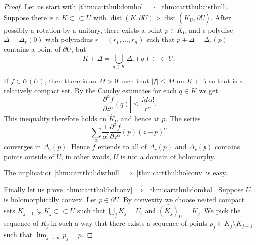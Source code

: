 \documentclass[12pt,openany]{book}
\newcommand{\sabs}[1]{\lvert {#1} \rvert}
\newcommand{\abs}[1]{\left\lvert {#1} \right\rvert}
\newcommand{\sO}{{\mathcal{O}}}
\theoremstyle{plain}
\theoremstyle{remark}
\theoremstyle{definition}
\theoremstyle{exercise}
\theoremstyle{example}
\begin{document}
\begin{proof}
Let us start with \eqref{thm:cartthul:domhol} $\Rightarrow$
\eqref{thm:cartthul:disthull}.  Suppose there is a $K \subset
\subset U$ with $\operatorname{dist}(K,\partial U) > \operatorname{dist}(\widehat{K}_U,\partial U)$.
After possibly a rotation by a unitary,
there exists a point $p \in \widehat{K}_U$ and a polydisc
$\Delta = \Delta_r(0)$ with polyradius $r = (r_1,\ldots,r_n)$ such that
$p + \Delta = \Delta_r(p)$ contains a point of $\partial U$, but
\begin{equation*}
K + \Delta = \bigcup_{q \in K} \Delta_r(q) \subset \subset U.
\end{equation*}

\begin{center}

\end{center}

If $f \in \sO(U)$, then there is an $M > 0$ such that $\sabs{f} \leq M$ on
$K + \Delta$ as that is a relatively compact set.  By the Cauchy estimates
for each $q \in K$ we get
\begin{equation*}
\abs{\frac{\partial^\alpha f}{\partial z^\alpha}(q)} \leq \frac{M
\alpha!}{r^\alpha} .
\end{equation*}
This inequality therefore holds on $\widehat{K}_U$ and hence at $p$.
The series
\begin{equation*}
\sum_{\alpha}
\frac{1}{\alpha !}\frac{\partial^\alpha f}{\partial z^\alpha}(p) {(z-p)}^\alpha 
\end{equation*}
converges in $\Delta_r(p)$.  Hence $f$ extends to all of $\Delta_r(p)$ and
$\Delta_r(p)$ contains points outside of $U$, in other words,
$U$ is not a domain of holomorphy.

The implication \eqref{thm:cartthul:disthull} $\Rightarrow$
\eqref{thm:cartthul:holconv} is easy.

Finally let us prove
\eqref{thm:cartthul:holconv} $\Rightarrow$
\eqref{thm:cartthul:domhol}.
Suppose $U$ is holomorphically convex.  Let $p \in \partial U$.
By convexity we choose nested compact sets $K_{j-1} \subsetneq K_j \subset
\subset U$ such that $\bigcup_j K_j = U$, and $\widehat{(K_j)}_U = K_j$.
We pick the sequence of $K_j$ in such a way that 
there exists a 
sequence of points $p_j \in K_j \setminus K_{j-1}$ such that
$\lim_{j\to\infty} p_j = p$.


\end{proof}
\end{document}
